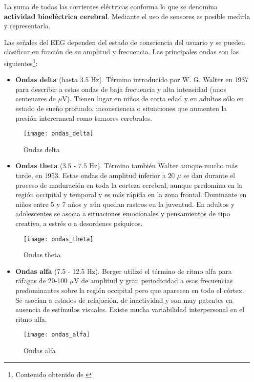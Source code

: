 La suma de todas las corrientes eléctricas conforma lo que se denomina \textbf{actividad bioeléctrica cerebral}. Mediante el uso de sensores es posible medirla y representarla.

Las señales del EEG dependen del estado de consciencia del usuario y se pueden clasificar en función de su amplitud y frecuencia. Las principales ondas son las siguientes\footnote{Contenido obtenido de \cite{apuntes}}:

\begin{itemize}
\item\textbf{Ondas delta} (hasta 3.5 Hz). Término introducido por W. G. Walter en 1937 para describir a estas ondas de baja frecuencia y alta intensidad (unos centenares de $\mu$V). Tienen lugar en niños de corta edad y en adultos sólo en estado de sueño profundo, inconsciencia o situaciones que aumenten la presión intercraneal como tumores cerebrales.
\end{itemize}
\begin{figure} [H]
    \centering
    \texttt{[image: ondas\_delta]}
    \caption{Ondas delta \cite{apuntes}}
    \label{fig:ondas_delta}
\end{figure}

\clearpage

\begin{itemize}
\item\textbf{Ondas theta} (3.5 - 7.5 Hz). Término también Walter aunque mucho más tarde, en 1953. Estas ondas de amplitud inferior a 20 $\mu$ se dan durante el proceso de maduración en toda la corteza cerebral, aunque predomina en la región occipital y temporal y es más rápida en la zona frontal. Dominante en niños entre 5 y 7 años y aún quedan rastros en la juventud. En adultos y adolescentes se asocia a situaciones emocionales y pensamientos de tipo creativo, a estrés o a desordenes psíquicos.
\end{itemize}
\begin{figure} [H]
    \centering
    \texttt{[image: ondas\_theta]}
    \caption{Ondas theta \cite{apuntes}}
    \label{fig:ondas_theta}
\end{figure}

\begin{itemize}
\item\textbf{Ondas alfa} (7.5 - 12.5 Hz). Berger utilizó el término de ritmo alfa para ráfagas de 20-100 $\mu$V de amplitud y gran periodicidad a esas frecuencias predominantes sobre la región occipital pero que aparecen en todo el córtex. Se asocian a estados de relajación, de inactividad y son muy patentes en ausencia de estímulos visuales. Existe mucha variabilidad interpersonal en el ritmo alfa.
\end{itemize}
\begin{figure} [H]
    \centering
    \texttt{[image: ondas\_alfa]}
    \caption{Ondas alfa \cite{apuntes}}
    \label{fig:ondas_alfa}
\end{figure}

